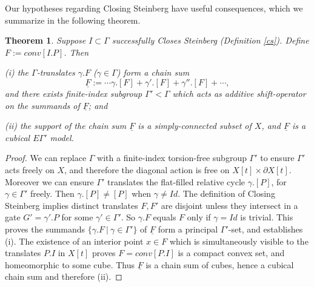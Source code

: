 \documentclass[12pt]{amsart}
\newtheorem{thm}{Theorem}
\theoremstyle{definition}
\theoremstyle{remark}
\newcommand{\del}{\partial}
\newcommand{\bD}{\textbf{D}}
\newcommand{\uF}{\underline{F}}
\begin{document}
Our hypotheses regarding Closing Steinberg have useful consequences, which we summarize in the following theorem.
\begin{thm}\label{cs1} 
Suppose $I \subset \Gamma$ successfully Closes Steinberg (Definition \ref{cs}). Define $F:=conv[I.P]$. Then

(i) the $\Gamma$-translates $\gamma.F$ ($\gamma \in \Gamma$) form a chain sum $$\uF:= \cdots \gamma.[F] + \gamma'.[F] + \gamma''.[F]+\cdots, $$ and there exists finite-index subgroup $\Gamma' <\Gamma$ which acts as additive shift-operator on the summands of $\uF$; and

(ii) the support of the chain sum $\uF$ is a simply-connected subset of $X$, and $\uF$ is a cubical $E\Gamma'$ model.

\end{thm}
\begin{proof}
We can replace $\Gamma$ with a finite-index torsion-free subgroup $\Gamma'$ to ensure $\Gamma'$ acts freely on $X$, and therefore the diagonal action is free on $X[t] \times \del X[t]$. Moreover we can ensure $\Gamma'$ translates the flat-filled relative cycle $\gamma.[P]$, for $\gamma\in \Gamma'$ freely. Then $\gamma.[P] \neq [P]$ when $\gamma\neq Id$. The definition of Closing Steinberg implies distinct translates $F, F'$ are disjoint unless they intersect in a gate $G'=\gamma'.P$ for some $\gamma' \in \Gamma'$. So $\gamma.F$ equals $F$ only if $\gamma=Id$ is trivial. This proves the summands $\{\gamma.F~|~ \gamma\in \Gamma'\}$ of $\uF$ form a principal $\Gamma'$-set, and establishes (i). The existence of an interior point $x\in F$ which is simultaneously visible to the translates $P.I$ in $X[t]$ proves $F=conv[P.I]$ is a compact convex set, and homeomorphic to some cube. Thus $\uF$ is a chain sum of cubes, hence a cubical chain sum and therefore (ii). 
\end{proof}













\end{document}
